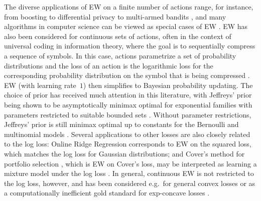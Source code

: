\documentclass{colt2018} %
\begin{document}
The diverse applications of EW on a finite number of actions range, for
instance, from boosting \citep{FreundSchapire1997} to differential
privacy \citep{DworkBook2014} to multi-armed bandits \citep{aueretal2002}, and many algorithms in
computer science can be viewed as special cases of EW \citep{Arora}.
% 
EW has also been considered for continuous sets of actions, often in the context of universal coding in information theory, where
the goal is to sequentially compress a sequence of symbols. In this
case, actions parametrize a set of probability distributions and the
loss of an action is the logarithmic loss for the corresponding
probability distribution on the symbol that is being compressed
\citep[Chapter~9]{CesaBianchiLugosi2006}. EW (with learning rate~$1$) then simplifies to Bayesian probability updating. The choice of
prior has received much attention in this literature, with Jeffreys'
prior being shown to be asymptotically minimax optimal for exponential
families with parameters restricted to suitable bounded sets 
\citep[Chapter~8]{Grunwald2007}. Without parameter restrictions,
Jeffreys' prior is still minimax optimal up to constants for the
Bernoulli and multinomial models
\citep{krichevsky1981performance,XieBarron}. Several applications to
other losses are also closely related to the log loss: Online
Ridge Regression corresponds to EW on the squared loss, which matches
the log loss for Gaussian distributions; and Cover's method for
portfolio selection \citep{Cover1991}, which is EW on
Cover's loss, may be interpreted as
learning a mixture model under the log loss
\citep{orseau2017soft}. In general, continuous EW is not restricted to
the log loss, however, and has been considered e.g.\ for general convex
losses \citep{DickGyorgyCzepesvari2014} or as a computationally
inefficient gold standard for exp-concave losses
\citep{HazanAgarwalKale2007}.

% 
% 
% 
% 
% 
% 
% 
% 
% 
% 
% 
% 
% 


% 

% 
% 
% 
% 
% 
% 
% 
% 
% 
% 
% 
% 
% 
% 
% 
% 
% 
% 
% 
% 
% 
% 
% 
% 
% 

% 
% 
% 
% 

% 
% 
% 

% 
% 
% 
% 
% 
% 
% 
% 
% 

% 
% 
% 
% 

% 
% 
% 

% 
% 

% 
% 

% 
% 
% 
% 
% 
% 

% 
% 
% 
% 
\end{document}
